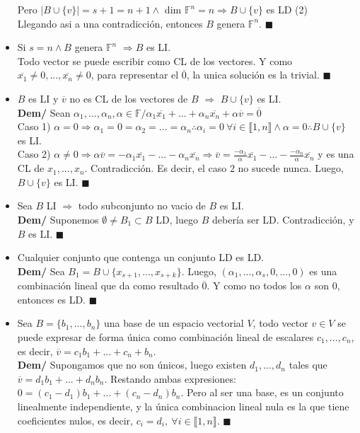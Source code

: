 \documentclass[11pt,a4paper]{article}
\newcommand*{\QEDA}{\null\nobreak\hfill\ensuremath{\blacksquare}}
\begin{document}
\begin{itemize}
Pero $|B \cup \{v\}| = s + 1 = n + 1 \land $ dim $\mathbb{F}^n = n \Rightarrow B \cup \{v\}$ es LD \hfill (2)\\
Llegando asi a una contradicci\'on, entonces $B$ genera $\mathbb{F}^n$. \QEDA
\item Si $s=n \land B$ genera $\mathbb{F}^n$ $\Rightarrow B$ es LI.\\
Todo vector se puede escribir como CL de los vectores. Y como $\overline{x_1}\not=0, ..., \overline{x_n} \not = 0$, para representar el $\overline{0}$, la unica soluci\'on es la trivial. \QEDA
\item $B$ es LI y $\overline{v}$ no es CL de los vectores de $B$ $\Rightarrow$ $B \cup \{v\}$ es LI.\\
\textbf{Dem/} Sean $\alpha_1, ..., \alpha_n, \alpha \in \mathbb{F} / \alpha_1\overline{x_1} + ... + \alpha_n\overline{x_n} + \alpha\overline{v} = \overline{0}$\\
Caso 1) $\alpha = 0 \Rightarrow \alpha_1 = 0 = \alpha_2 = ... = \alpha_n \therefore \alpha_i = 0\ \forall i \in \llbracket 1, n \rrbracket \land \alpha = 0 \therefore B \cup \{ v \}$ es LI.\\
Caso 2) $\alpha \not = 0 \Rightarrow \alpha\overline{v} = -\alpha_1\overline{x_1} - ... - \alpha_n \overline{x_n} \Rightarrow \overline{v} = \frac{-\alpha_1}{\alpha}\overline{x_1} - ... - \frac{-\alpha_n}{\alpha}\overline{x_n}$ y es una CL de $x_1,...,x_n$. Contradicci\'on. Es decir, el caso 2 no sucede nunca. Luego, $B \cup \{ v \}$ es LI. \QEDA
\item Sea $B$ LI $\Rightarrow$ todo subconjunto no vacio de $B$ es LI.\\
\textbf{Dem/} Suponemos $\emptyset \not = B_1 \subset B$ LD, luego $B$ deber\'ia ser LD. Contradicci\'on, y $B$ es LI. \QEDA
\item Cualquier conjunto que contenga un conjunto LD es LD.\\
\textbf{Dem/} Sea $B_1 = B \cup \{ x_{s+1}, ..., x_{s+k}\}$. Luego, $(\alpha_1, ..., \alpha_s, 0, ..., 0)$ es una combinaci\'on lineal que da como resultado $\overline{0}$. Y como no todos los $\alpha$ son 0, entonces es LD. \QEDA
\item Sea $B=\{b_1,...,b_n\}$ una base de un espacio vectorial $V$, todo vector $v \in V$ se puede expresar de forma \'unica como combinaci\'on lineal de escalares $c_1,...,c_n$, es decir, $\overline{v}=c_1b_1+...+c_n+b_n$.\\
\textbf{Dem/} Supongamos que no son \'unicos, luego existen $d_1,...,d_n$ tales que $\overline{v}=d_1b_1+...+d_nb_n$. Restando ambas expresiones: $0 = (c_1-d_1)b_1 + ... + (c_n-d_n)b_n$. Pero al ser una base, es un conjunto linealmente independiente, y la \'unica combinacion lineal nula es la que tiene coeficientes nulos, es decir, $c_i = d_i,\ \forall i \in \llbracket 1,n \rrbracket$. \QEDA

\end{itemize}
\end{document}
